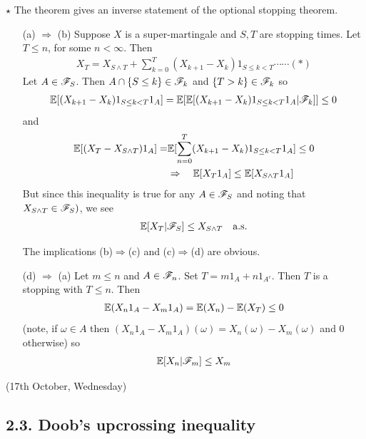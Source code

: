 \documentclass[12pt,a4paper]{report}
\newenvironment{proof}
{\begin{changemargin}{1cm}{0.5cm} 
	}%
	{\end{changemargin}
}
\begin{document}
$\star$ The theorem gives an inverse statement of the optional stopping theorem.
\s

\begin{proof}
\pf

\begin{itemize}
\item[(a) $\Rightarrow$ (b)] Suppose $X$ is a super-martingale and $S,T$ are stopping times. Let $T\leq n$, for some $n<\infty$. Then
\begin{align*}
X_T = X_{S\wedge T} + \sum_{k=0}^T (X_{k+1} - X_k) 1_{S\leq k<T} \cdots \cdots (*)
\end{align*}
Let $A \in \mathscr{F}_S$. Then $A\cap \{ S\leq k\}\in \mathscr{F}_k$ and $\{T>k\} \in \mathscr{F}_k$ so
\begin{align*}
\mathbb{E}[(X_{k+1} - X_k) 1_{S\leq k<T} 1_A] =\mathbb{E}[\mathbb{E}[(X_{k+1} - X_k) 1_{S\leq k<T} 1_A|\mathscr{F}_k]] \leq 0
\end{align*}
and
\begin{align*}
\mathbb{E}[(X_T - X_{S\wedge T}) 1_A] = & \mathbb{E}[\sum_{n=0}^T (X_{k+1} - X_k) 1_{S\leq k<T} 1_A] \leq 0 \\
& \Rightarrow \quad \mathbb{E}[ X_T 1_A] \leq \mathbb{E}[X_{S\wedge T} 1_A] \\
\end{align*}
But since this inequality is true for any $A\in \mathscr{F}_S$ and noting that $X_{S\wedge T} \in \mathscr{F}_S)$, we see
\begin{align*}
\mathbb{E}[X_T |\mathscr{F}_S] \leq X_{S\wedge T} \quad \text{a.s.}
\end{align*}
\s

The implications (b)$\Rightarrow$(c) and (c)$\Rightarrow$(d) are obvious.
\s

\item[(d) $\Rightarrow$ (a)] Let $m\leq n$ and $A\in \mathscr{F}_n$. Set $T= m1_A + n1_{A^c}$. Then $T$ is a stopping with $T\leq n$. Then
\begin{align*}
\mathbb{E}(X_n 1_A -X_m 1_A) = \mathbb{E}(X_n) - \mathbb{E}(X_T) \leq 0
\end{align*}
(note, if $\omega \in A$ then $(X_n1_A - X_m1_A)(\omega) = X_n(\omega) -X_m(\omega)$ and $0$ otherwise) so
\begin{align*}
\mathbb{E}[X_n | \mathscr{F}_m] \leq X_m
\end{align*}
\end{itemize}
\eop
\end{proof}
\s

\newday

(17th October, Wednesday)
\s

\subsection*{2.3. Doob's upcrossing inequality}
\end{document}
